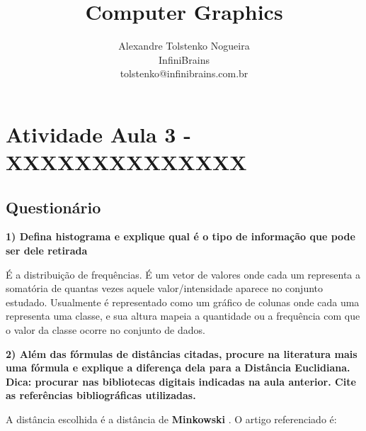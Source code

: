 \documentclass[a4paper]{sbgames}               %
\title{Computer Graphics}
\author{Alexandre Tolstenko Nogueira\\InfiniBrains\\tolstenko@infinibrains.com.br 
}
\begin{document}


\maketitle




\section{Atividade Aula 3 - XXXXXXXXXXXXXX}

\subsection*{Questionário}

\textbf{1) Defina histograma e explique qual é o tipo de informação que pode ser dele retirada}

É a distribuição de frequências. É um vetor de valores onde cada um representa a somatória de quantas vezes aquele valor/intensidade aparece no conjunto estudado. Usualmente é representado como um gráfico de colunas onde cada uma representa uma classe, e sua altura mapeia a quantidade ou a frequência com que o valor da classe ocorre no conjunto de dados.

\textbf{2) Além das fórmulas de distâncias citadas, procure na literatura mais uma fórmula e explique a diferença dela para a Distância Euclidiana. Dica: procurar nas bibliotecas digitais indicadas na aula anterior. Cite as referências bibliográficas
utilizadas.
}

A distância escolhida é a distância de \textbf{Minkowski} \cite{chouikhi2017improved}. O artigo referenciado é:
\end{document}

